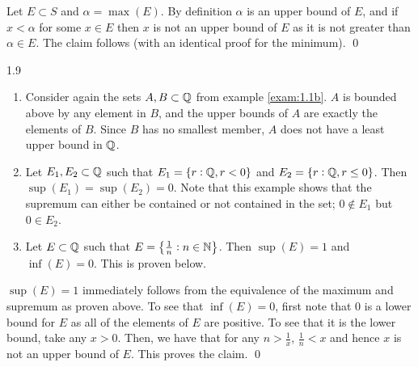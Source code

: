 \begin{nproof}
    Let $E \subset S$ and $\alpha = \max(E)$. By definition $\alpha$ is an upper bound of $E$, and if $x < \alpha$ for some $x \in E$ then $x$ is not an upper bound of $E$ as it is not greater than $\alpha \in E$. The claim follows (with an identical proof for the minimum). \qed
\end{nproof}

\begin{example}{}{1.9}
    \begin{enumerate}
        \item Consider again the sets $A, B \subset \mathbb{Q}$ from example \ref{exam:1.1b}. $A$ is bounded above by any element in $B$, and the upper bounds of $A$ are exactly the elements of $B$. Since $B$ has no smallest member, $A$ does not have a least upper bound in $\mathbb{Q}$.
        \item Let $E_1, E_2 \subset \mathbb{Q}$ such that $E_1 = \set{r: \mathbb{Q}, r < 0}$ and $E_2 = \set{r: \mathbb{Q}, r \leq 0}$. Then $\sup(E_1) = \sup(E_2) = 0$. Note that this example shows that the supremum can either be contained or not contained in the set; $0 \notin E_1$ but $0 \in E_2$. 
        \item Let $E \subset \mathbb{Q}$ such that $E = \set{\frac{1}{n}: n \in \mathbb{N}}$. Then $\sup(E) = 1$ and $\inf(E) = 0$. This is proven below. 
    \end{enumerate}
\end{example}
\begin{nproof}
    $\sup(E) = 1$ immediately follows from the equivalence of the maximum and supremum as proven above. To see that $\inf(E) = 0$, first note that $0$ is a lower bound for $E$ as all of the elements of $E$ are positive. To see that it is the lower bound, take any $x > 0$. Then, we have that for any $n > \frac{1}{x}$, $\frac{1}{n} < x$ and hence $x$ is not an upper bound of $E$. This proves the claim. \qed
\end{nproof}

